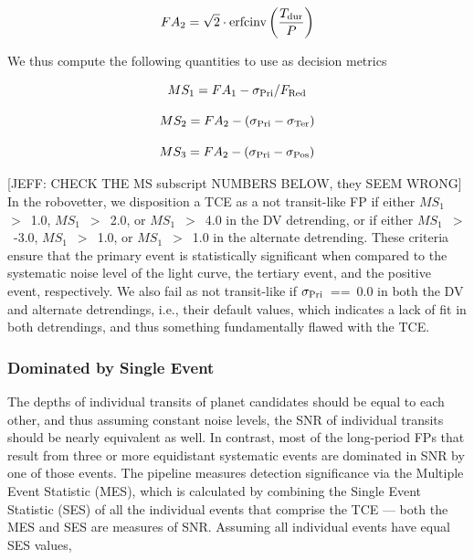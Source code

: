 \begin{equation}
    FA_{2} = \sqrt{2}\cdot \textrm{erfcinv}\left(\frac{T_{\rm dur}}{P}\right)
\end{equation}

\noindent We thus compute the following quantities to use as decision metrics

\begin{equation}
    MS_{1} = FA_{1} - \sigma_{\rm Pri}/F_{\rm Red}
\end{equation}

\begin{equation}
    MS_{2} = FA_{2} - (\sigma_{\rm Pri} - \sigma_{\rm Ter})
\end{equation}

\begin{equation}
    MS_{3} = FA_{2} - (\sigma_{\rm Pri} - \sigma_{\rm Pos})
\end{equation}

[JEFF: CHECK THE MS subscript NUMBERS BELOW, they SEEM WRONG]
In the robovetter, we disposition a TCE as a not transit-like FP if either $MS_{1}$~$>$~1.0, $MS_{1}$~$>$~2.0, or $MS_{1}$~$>$~4.0 in the DV detrending, or if either $MS_{1}$~$>$~-3.0, $MS_{1}$~$>$~1.0, or $MS_{1}$~$>$~1.0 in the alternate detrending. These criteria ensure that the primary event is statistically significant when compared to the systematic noise level of the light curve, the tertiary event, and the positive event, respectively. We also fail as not transit-like if $\sigma_{\rm Pri}$~==~0.0 in both the DV and alternate detrendings, i.e., their default values, which indicates a lack of fit in both detrendings, and thus something fundamentally flawed with the TCE.


\subsubsection{Dominated by Single Event}
\label{s:sesmes}

The depths of individual transits of planet candidates should be equal to each other, and thus assuming constant noise levels, the SNR of individual transits should be nearly equivalent as well. In contrast, most of the long-period FPs that result from three or more equidistant systematic events are dominated in SNR by one of those events. The \kepler{} pipeline measures detection significance via the Multiple Event Statistic (MES), which is calculated by combining the Single Event Statistic (SES) of all the individual events that comprise the TCE --- both the MES and SES are measures of SNR. Assuming all individual events have equal SES values,

